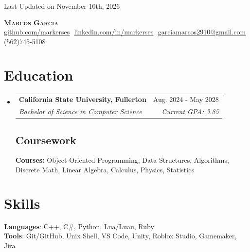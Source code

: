 \documentclass[letterpaper,11pt]{article}
\makeatletter
\newcommand{\resumeSubheading}[4]{
  \vspace{-2pt}\item
    \begin{tabular*}{0.97\textwidth}[t]{l@{\extracolsep{\fill}}r}
      \textbf{#1} & #2 \\
      \textit{\small#3} & \textit{\small #4} \\
    \end{tabular*}\vspace{-7pt}
}
\newcommand{\resumeSubHeadingListStart}{\begin{itemize}[leftmargin=0.15in, label={}]}
\newcommand{\resumeSubHeadingListEnd}{\end{itemize}}
\makeatother
\begin{document}
\begin{flushright}
  \color{gray}
  \item
  Last Updated on November 10th, 2026
\end{flushright}

\vspace{-5pt}

\begin{center}
    \textbf{\Huge \scshape Marcos Garcia} \\ \vspace{8pt}
    \small 
    \href{https://github.com/markerses}{\underline{github.com/markerses}} $  $
    \href{https://linkedin.com/in/markerses}{\underline{linkedin.com/in/markerses}} $  $
    \href{mailto:garciamarcos2910@gmail.com}
    {\underline{garciamarcos2910@gmail.com}}
    {(562)745-5108}
\end{center}

\section{Education}
  \resumeSubHeadingListStart
  
    \resumeSubheading
      {California State University, Fullerton}{Aug. 2024 - May 2028}
      {Bachelor of Science in Computer Science}{Current GPA: 3.85}


    \vspace{-10pt}

    \subsection{Coursework}
      \textbf{Courses:} Object-Oriented Programming, Data Structures, Algorithms, Discrete Math, Linear Algebra, Calculus, Physics, Statistics

  \resumeSubHeadingListEnd

\section{Skills}
 \begin{itemize}[leftmargin=0.15in, label={}]
    \small{\item{
    
     \textbf{Languages}{: C++, C\#, Python, Lua/Luau, Ruby} \\
     
     \textbf{Tools}{: Git/GitHub, Unix Shell, VS Code, Unity, Roblox Studio, Gamemaker, Jira}
     
     
     
    }}
 \end{itemize}
\end{document}
